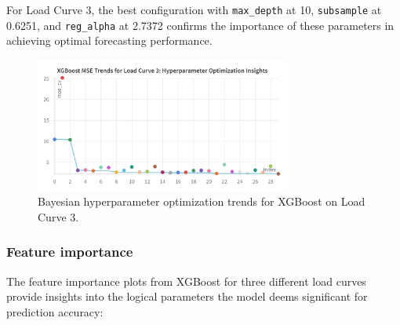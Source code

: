 \documentclass{article} %
\begin{document}
For Load Curve 3, the best configuration with \texttt{max\_depth} at 10, \texttt{subsample} at 0.6251, and \texttt{reg\_alpha} at 2.7372 confirms the importance of these parameters in achieving optimal forecasting performance.
\begin{figure}[H]
    \centering
    \includegraphics[width=0.75\textwidth]{ressources/Hyperparams/XGBoost/XGBoost MSE Trends for Load Curve 3 Hyperparameter Optimization Insights.png }
    \caption{Bayesian hyperparameter optimization trends for XGBoost on Load Curve 3.}
    \label{fig:xgboost_lc3}
\end{figure}
\subsubsection{Feature importance}

The feature importance plots from XGBoost for three different load curves provide insights into the logical parameters the model deems significant for prediction accuracy:
\end{document}
